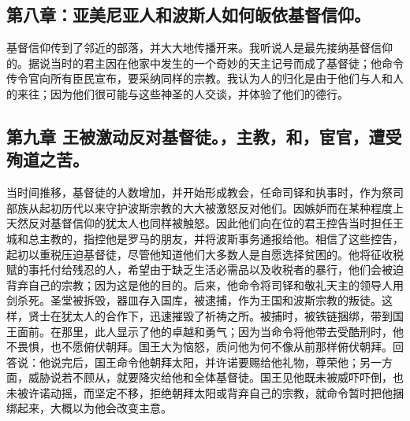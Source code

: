 
\subsection{第八章：亚美尼亚人和波斯人如何皈依基督信仰。}

基督信仰传到了邻近的部落，并大大地传播开来。我听说人是最先接纳基督信仰的。据说当时的君主因在他家中发生的一个奇妙的天主记号而成了基督徒；他命令传令官向所有臣民宣布，要采纳同样的宗教。我认为人的归化是由于他们与人和人的来往；因为他们很可能与这些神圣的人交谈，并体验了他们的德行。\par


\subsection{第九章 王被激动反对基督徒。，主教，和，宦官，遭受殉道之苦。}

当时间推移，基督徒的人数增加，并开始形成教会，任命司铎和执事时，作为祭司部族从起初历代以来守护波斯宗教的大大被激怒反对他们。因嫉妒而在某种程度上天然反对基督信仰的犹太人也同样被触怒。因此他们向在位的君王控告当时担任王城和总主教的，指控他是罗马的朋友，并将波斯事务通报给他。相信了这些控告，起初以重税压迫基督徒，尽管他知道他们大多数人是自愿选择贫困的。他将征收税赋的事托付给残忍的人，希望由于缺乏生活必需品以及收税者的暴行，他们会被迫背弃自己的宗教；因为这是他的目的。后来，他命令将司铎和敬礼天主的领导人用剑杀死。圣堂被拆毁，器皿存入国库，被逮捕，作为王国和波斯宗教的叛徒。这样，贤士在犹太人的合作下，迅速摧毁了祈祷之所。被捕时，被铁链捆绑，带到国王面前。在那里，此人显示了他的卓越和勇气；因为当命令将他带去受酷刑时，他不畏惧，也不愿俯伏朝拜。国王大为恼怒，质问他为何不像从前那样俯伏朝拜。回答说：他说完后，国王命令他朝拜太阳，并许诺要赐给他礼物，尊荣他；另一方面，威胁说若不顾从，就要降灾给他和全体基督徒。国王见他既未被威吓吓倒，也未被许诺动摇，而坚定不移，拒绝朝拜太阳或背弃自己的宗教，就命令暂时把他捆绑起来，大概以为他会改变主意。\par

